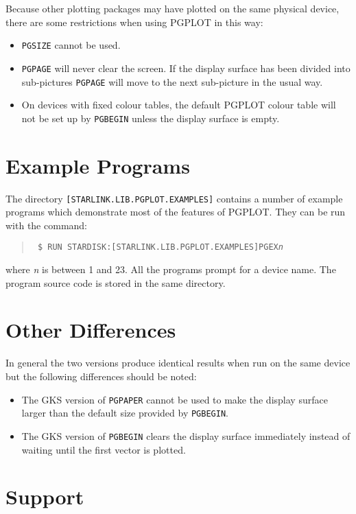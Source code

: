 Because other plotting packages may have plotted on the same physical device,
there are some restrictions when using PGPLOT in this way:

\begin{itemize}
\item {\tt PGSIZE} cannot be used.

\item {\tt PGPAGE} will never clear the screen. If the display surface has
been divided into sub-pictures {\tt PGPAGE} will move to the next sub-picture
in the usual way.

\item On devices with fixed colour tables, the default PGPLOT colour table
will not be set up by {\tt PGBEGIN} unless the display surface is empty.

\end{itemize}

\section{Example Programs}

The directory {\tt [STARLINK.LIB.PGPLOT.EXAMPLES]} contains a number of example
programs which demonstrate most of the features of PGPLOT. They can be run
with the command:
\begin{quote}\tt
\$ RUN STARDISK:[STARLINK.LIB.PGPLOT.EXAMPLES]PGEX{\em n}
\end{quote}
where {\em n} is between 1 and 23. All the programs prompt for a device
name. The program source code is stored in the same directory.

\section{Other Differences}
In general the two versions produce identical results when run on the same
device but the following differences should be noted:
\begin{itemize}
\item The GKS version of {\tt PGPAPER} cannot be used to make the display surface
larger than the default size provided by {\tt PGBEGIN}.
\item The GKS version of {\tt PGBEGIN} clears the display surface immediately
instead of waiting until the first vector is plotted.
\end{itemize}

\section{Support}

